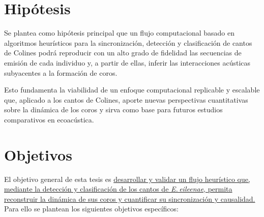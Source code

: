 \section{Hipótesis}
\label{sec:hipotesis}

Se plantea como hipótesis principal que un flujo computacional 
basado en algoritmos heurísticos para la sincronización, 
detección y clasificación de cantos de Colines podrá reproducir con un alto 
grado de fidelidad las secuencias de emisión de cada individuo 
y, a partir de ellas, inferir las interacciones acústicas 
subyacentes a la formación de coros. 


Esto fundamenta la 
viabilidad de un enfoque computacional replicable y escalable 
que, aplicado a los cantos de Colines, aporte 
nuevas perspectivas cuantitativas sobre la dinámica de los coros 
y sirva como base para futuros estudios comparativos en 
ecoacústica.  


\section{Objetivos}
\label{sec:objetivos}

El objetivo general de esta tesis es \ul{desarrollar y 
validar un flujo heurístico que, mediante la detección y 
clasificación de los cantos de \emph{E.\,eileenae}, permita 
reconstruir la dinámica de sus coros y cuantificar su 
sincronización y causalidad.}
Para ello se plantean los siguientes objetivos específicos:


